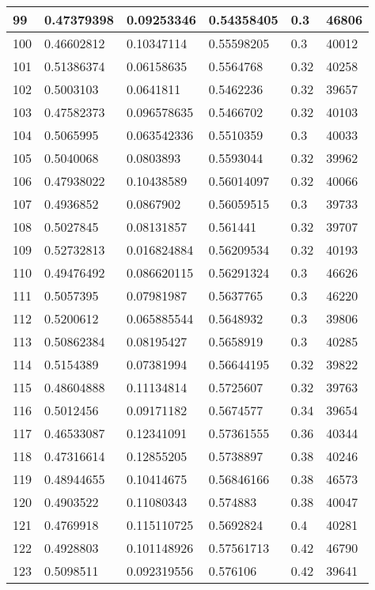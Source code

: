 \begin{longtable}{|l|l|l|l|l|l|}
99 & 0.47379398 & 0.09253346 & 0.54358405 & 0.3 & 46806 \\ \hline 
100 & 0.46602812 & 0.10347114 & 0.55598205 & 0.3 & 40012 \\ \hline 
101 & 0.51386374 & 0.06158635 & 0.5564768 & 0.32 & 40258 \\ \hline 
102 & 0.5003103 & 0.0641811 & 0.5462236 & 0.32 & 39657 \\ \hline 
103 & 0.47582373 & 0.096578635 & 0.5466702 & 0.32 & 40103 \\ \hline 
104 & 0.5065995 & 0.063542336 & 0.5510359 & 0.3 & 40033 \\ \hline 
105 & 0.5040068 & 0.0803893 & 0.5593044 & 0.32 & 39962 \\ \hline 
106 & 0.47938022 & 0.10438589 & 0.56014097 & 0.32 & 40066 \\ \hline 
107 & 0.4936852 & 0.0867902 & 0.56059515 & 0.3 & 39733 \\ \hline 
108 & 0.5027845 & 0.08131857 & 0.561441 & 0.32 & 39707 \\ \hline 
109 & 0.52732813 & 0.016824884 & 0.56209534 & 0.32 & 40193 \\ \hline 
110 & 0.49476492 & 0.086620115 & 0.56291324 & 0.3 & 46626 \\ \hline 
111 & 0.5057395 & 0.07981987 & 0.5637765 & 0.3 & 46220 \\ \hline 
112 & 0.5200612 & 0.065885544 & 0.5648932 & 0.3 & 39806 \\ \hline 
113 & 0.50862384 & 0.08195427 & 0.5658919 & 0.3 & 40285 \\ \hline 
114 & 0.5154389 & 0.07381994 & 0.56644195 & 0.32 & 39822 \\ \hline 
115 & 0.48604888 & 0.11134814 & 0.5725607 & 0.32 & 39763 \\ \hline 
116 & 0.5012456 & 0.09171182 & 0.5674577 & 0.34 & 39654 \\ \hline 
117 & 0.46533087 & 0.12341091 & 0.57361555 & 0.36 & 40344 \\ \hline 
118 & 0.47316614 & 0.12855205 & 0.5738897 & 0.38 & 40246 \\ \hline 
119 & 0.48944655 & 0.10414675 & 0.56846166 & 0.38 & 46573 \\ \hline 
120 & 0.4903522 & 0.11080343 & 0.574883 & 0.38 & 40047 \\ \hline 
121 & 0.4769918 & 0.115110725 & 0.5692824 & 0.4 & 40281 \\ \hline 
122 & 0.4928803 & 0.101148926 & 0.57561713 & 0.42 & 46790 \\ \hline 
123 & 0.5098511 & 0.092319556 & 0.576106 & 0.42 & 39641 \\ \hline 

\end{longtable}
